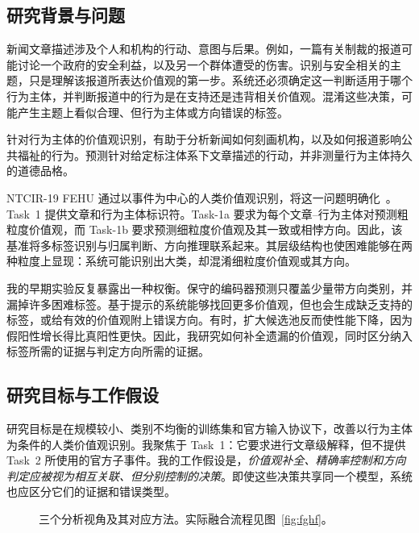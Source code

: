 \documentclass[12pt,a4paper]{article}
\begin{document}
\subsection{研究背景与问题}
新闻文章描述涉及个人和机构的行动、意图与后果。例如，一篇有关制裁的报道可能讨论一个政府的安全利益，以及另一个群体遭受的伤害。识别与安全相关的主题，只是理解该报道所表达价值观的第一步。系统还必须确定这一判断适用于哪个行为主体，并判断报道中的行为是在支持还是违背相关价值观。混淆这些决策，可能产生主题上看似合理、但行为主体或方向错误的标签。

针对行为主体的价值观识别，有助于分析新闻如何刻画机构，以及如何报道影响公共福祉的行为。预测针对给定标注体系下文章描述的行动，并非测量行为主体持久的道德品格。

NTCIR-19 FEHU 通过以事件为中心的人类价值观识别，将这一问题明确化~\cite{fehuoverview}。Task~1 提供文章和行为主体标识符。Task-1a 要求为每个文章--行为主体对预测粗粒度价值观，而 Task-1b 要求预测细粒度价值观及其一致或相悖方向。因此，该基准将多标签识别与归属判断、方向推理联系起来。其层级结构也使困难能够在两种粒度上显现：系统可能识别出大类，却混淆细粒度价值观或其方向。

我的早期实验反复暴露出一种权衡。保守的编码器预测只覆盖少量带方向类别，并漏掉许多困难标签。基于提示的系统能够找回更多价值观，但也会生成缺乏支持的标签，或给有效的价值观附上错误方向。有时，扩大候选池反而使性能下降，因为假阳性增长得比真阳性更快。因此，我研究如何补全遗漏的价值观，同时区分纳入标签所需的证据与判定方向所需的证据。

\subsection{研究目标与工作假设}
研究目标是在规模较小、类别不均衡的训练集和官方输入协议下，改善以行为主体为条件的人类价值观识别。我聚焦于 Task~1：它要求进行文章级解释，但不提供 Task~2 所使用的官方子事件。我的工作假设是，\emph{价值观补全、精确率控制和方向判定应被视为相互关联、但分别控制的决策}。即使这些决策共享同一个模型，系统也应区分它们的证据和错误类型。


\begin{figure}[htbp]
\centering
{}
\caption{三个分析视角及其对应方法。实际融合流程见图~\ref{fig:fghf}。}
\label{fig:decisions}
\end{figure}
\end{document}
